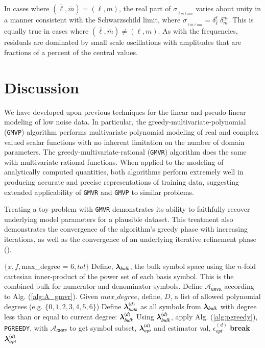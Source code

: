 \documentclass[twocolumn,aps,prd,floatfix,preprintnumbers,a4paper,nofootinbib,
superscriptaddress,10pt]{revtex4-1}
\def\LMlmn{_{\bar{\ell} \bar{m} \ell m n}}
\def\gmvp#1{greedy-multivariate-polynomial#1
  (\texttt{GMVP}#1)\gdef\gmvp{\texttt{GMVP}}}
\def\gmvr#1{greedy-multivariate-rational#1
  (\texttt{GMVR}#1)\gdef\gmvr{\texttt{GMVR}}}
\def\pgreedy{\texttt{PGREEDY}}
\begin{document}
%
In cases where $(\bar\ell,\bar{m})=(\ell,m)$, the real part of $\sigma_{\LMlmn}$ varies about unity in a manner consistent with the Schwarzschild limit, where $\sigma_{\LMlmn}=\delta_{\bar\ell}^{\ell}\;\delta_{\bar{m}}^{m}$.
%
This is equally true in cases where $(\bar\ell,\bar{m}) \neq (\ell,m)$.
%
As with the \qnm{} frequencies, residuals are dominated by small scale oscillations with amplitudes that are fractions of a percent of the central values.
%
\section{Discussion}
\label{discuss}
%
\par We have developed upon previous techniques for the linear and pseudo-linear modeling of low noise data.
%
In particular, the \gmvp{} algorithm performs multivariate polynomial modeling of real and complex valued scalar functions with no inherent limitation on the number of domain parameters.
%
The \gmvr{} algorithm does the same with multivariate rational functions.
%
When applied to the modeling of analytically computed quantities, both algorithms perform extremely well in producing accurate and precise representations of training data, suggesting extended applicability of \gmvr{} and \gmvp{} to similar problems.
%
\par Treating a toy problem with \gmvr{} demonstrates its ability to faithfully recover underlying model parameters for a plausible dataset.
%
This treatment also demonstrates the convergence of the algorithm's greedy phase with increasing iterations, as well as the convergence of an underlying iterative refinement phase ().
%
%
%
{\scriptsize
\begin{algorithm}[H]
  \caption{\gmvr{}, a degree tempered stepwise algorithm for multivariate rational modeling of scalar data.}
  \label{alg:gmvr}
  \begin{algorithmic}[1]
     $ \{ x, f, $max\_degree = 6$, tol \}$
    \vskip 10pt
    \State Define, ${\bm{\lambda}}_{bulk}$, the bulk symbol space using the $n$-fold cartesian inner-product of the power set of each basis symbol. This is the combined bulk for numerator and denominator symbols.
    \State Define $\mathcal{A}_{\gmvr{}}$ according to Alg. (\ref{alg:A_gmvr}).
    \State Given $max\_degree$, define, ${ D}$, a list of allowed polynomial degrees (e.g. $\{0,1,2,3,4,5,6\}$)
      \State Define ${\bm{\lambda}}_{bulk}^{(d)}$ as all symbols from ${\bm{\lambda}}_{bulk}$ with degree less than or equal to current degree: ${\bm{\lambda}}^{(d)}_{bulk}$
      \State Using ${\bm{\lambda}}_{bulk}^{(d)}$, apply Alg. (\ref{alg:pgreedy}), \pgreedy{}, with $\mathcal{A}_{\gmvp{}}$ to get symbol subset, ${\bm{\lambda}}^{(d)}_{opt}$ and estimator val, $\epsilon^{(d)}_{opt}$
        \State \textbf{break}
      \EndIf
    \EndFor
    \vskip 10pt
     ${\bm{\lambda}}^{(d)}_{opt}$
  \end{algorithmic}
\end{algorithm}
}
\end{document}
